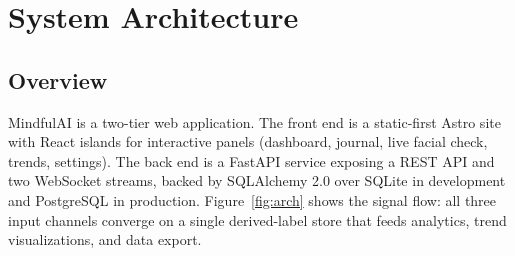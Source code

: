 \documentclass[11pt,a4paper]{article}
\newcommand{\system}{MindfulAI}
\begin{document}
\section{System Architecture}\label{sec:arch}

\subsection{Overview}

\system{} is a two-tier web application. The front end is a static-first Astro site with React islands for interactive panels (dashboard, journal, live facial check, trends, settings). The back end is a FastAPI service exposing a REST API and two WebSocket streams, backed by SQLAlchemy 2.0 over SQLite in development and PostgreSQL in production. Figure~\ref{fig:arch} shows the signal flow: all three input channels converge on a single derived-label store that feeds analytics, trend visualizations, and data export.
\end{document}
